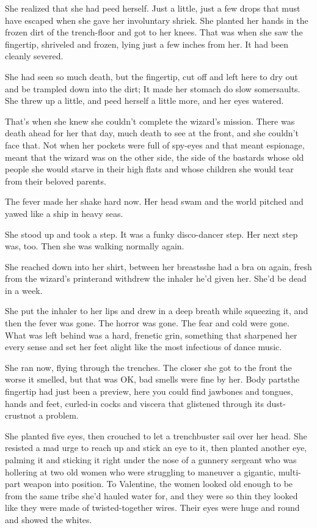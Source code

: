 She realized that she had peed herself. Just a little, just a few
drops that must have escaped when she gave her involuntary shriek.
She planted her hands in the frozen dirt of the trench-floor and
got to her knees. That was when she saw the fingertip, shriveled
and frozen, lying just a few inches from her. It had been cleanly
severed.

She had seen so much death, but the fingertip, cut off and left
here to dry out and be trampled down into the dirt; It made her
stomach do slow somersaults. She threw up a little, and peed
herself a little more, and her eyes watered.

That’s when she knew she couldn’t complete the wizard’s mission.
There was death ahead for her that day, much death to see at the
front, and she couldn’t face that. Not when her pockets were full
of spy-eyes and that meant espionage, meant that the wizard was on
the other side, the side of the bastards whose old people she would
starve in their high flats and whose children she would tear from
their beloved parents.

The fever made her shake hard now. Her head swam and the world
pitched and yawed like a ship in heavy seas.

She stood up and took a step. It was a funky disco-dancer step. Her
next step was, too. Then she was walking normally again.

She reached down into her shirt, between her breasts\dash{}she had a bra
on again, fresh from the wizard’s printer\dash{}and withdrew the inhaler
he’d given her. She’d be dead in a week.

She put the inhaler to her lips and drew in a deep breath while
squeezing it, and then the fever was gone. The horror was gone. The
fear and cold were gone. What was left behind was a hard, frenetic
grin, something that sharpened her every sense and set her feet
alight like the most infectious of dance music.

She ran now, flying through the trenches. The closer she got to the
front the worse it smelled, but that was OK, bad smells were fine
by her. Body parts\dash{}the fingertip had just been a preview, here you
could find jawbones and tongues, hands and feet, curled-in cocks
and viscera that glistened through its dust-crust\dash{}not a problem.

She planted five eyes, then crouched to let a trenchbuster sail
over her head. She resisted a mad urge to reach up and stick an eye
to it, then planted another eye, palming it and sticking it right
under the nose of a gunnery sergeant who was hollering at two old
women who were struggling to maneuver a gigantic, multi-part weapon
into position. To Valentine, the women looked old enough to be from
the same tribe she’d hauled water for, and they were so thin they
looked like they were made of twisted-together wires. Their eyes
were huge and round and showed the whites.


